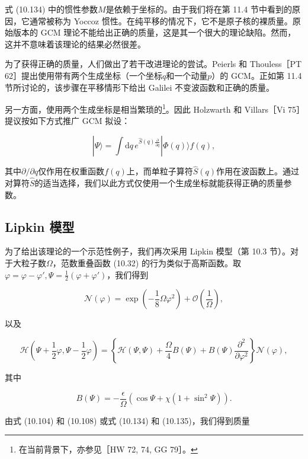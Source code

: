 式 (10.134) 中的惯性参数$M$是依赖于坐标的。由于我们将在第 11.4 节中看到的原因，它通常被称为 Yoccoz 惯性。在纯平移的情况下，它不是原子核的裸质量。原始版本的
GCM 理论不能给出正确的质量，这是其一个很大的理论缺陷。然而，这并不意味着该理论的结果必然很差。

为了获得正确的质量，人们做出了若干改进理论的尝试。Peierls 和 Thouless［PT 62］提出使用带有两个生成坐标（一个坐标$q$和一个动量$p$）的
GCM。正如第 11.4 节所讨论的，该步骤在平移情形下给出 Galilei 不变波函数和正确的质量。

另一方面，使用两个生成坐标是相当繁琐的\footnote{在当前背景下，亦参见［HW 72, 74, GG 79］。}。因此
Holzwarth 和 Villars［Vi 75］提议按如下方式推广 GCM 拟设：

\[
|\Psi\rangle=\int\mathrm{d}q\,e^{\hat{S}(q)\frac{\partial}{\partial q}}|\Phi(q)\rangle f(q),
\]

其中$\partial/\partial q$仅作用在权重函数$f(q)$上，而单粒子算符$\hat{S}(q)$作用在波函数上。通过对算符$\hat{S}$的适当选择，我们以此方式仅使用一个生成坐标就能获得正确的质量参数。

\subsection{Lipkin 模型}

为了给出该理论的一个示范性例子，我们再次采用 Lipkin 模型（第 10.3 节）。对于大粒子数$\Omega$，范数重叠函数
(10.32) 的行为类似于高斯函数。取$\varphi=\varphi-\varphi',\Psi=\frac{1}{2}(\varphi+\varphi')$，我们得到

\begin{equation}
\mathscr{N}(\varphi)=\exp\left(-\frac{1}{8}\Omega\varphi^{2}\right)+\mathcal{O}\left(\frac{1}{\Omega}\right),\label{eq:10.137}
\end{equation}

以及

\begin{equation}
\mathscr{H}\left(\Psi+\frac{1}{2}\varphi,\Psi-\frac{1}{2}\varphi\right)=\left\{ \mathscr{H}(\Psi,\Psi)+\frac{\Omega}{4}B(\Psi)+B(\Psi)\frac{\partial^{2}}{\partial\varphi^{2}}\right\} \mathscr{N}(\varphi),\label{eq:10.138}
\end{equation}

其中

\begin{equation}
B(\Psi)=-\frac{\epsilon}{\Omega}\left(\cos\Psi+\chi(1+\sin^{2}\Psi)\right).\label{eq:10.139}
\end{equation}

由式 (10.104) 和 (10.108) 或式 (10.134) 和 (10.135)，我们得到质量

